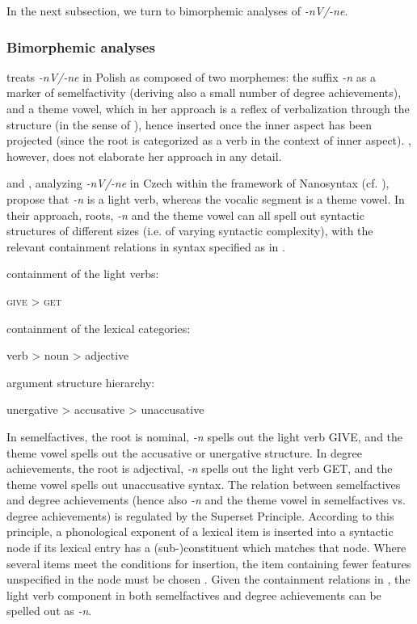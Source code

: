 \documentclass[output=paper,colorlinks,citecolor=brown]{langscibook}
\begin{document}
In the next subsection, we turn to bimorphemic analyses of \textit{-nV/-ne}. 

\subsubsection{Bimorphemic analyses} \label{str:sect:bimorphemic analyses}

\citet{sta+:Lazorczyk2010} treats \textit{-nV/-ne} in Polish as composed of two morphemes: the suffix \textit{-n} as a marker of semelfactivity (deriving also a small number of degree achievements), and a theme vowel, which in her approach is a reflex of verbalization through the structure (in the sense of \citealt{Borer2005Structuring}), hence inserted once the inner aspect has been projected (since the root is categorized as a verb in the context of inner aspect). \citet{sta+:Lazorczyk2010}, however, does not elaborate her approach in any detail.

\citet{TaraldsenMedovaWiland2019} and \citet{Wiland2019}, analyzing \textit{-nV/-ne} in Czech within the framework of Nanosyntax (cf. \citealt{Caha2009, Starke2009}), propose that \textit{-n} is a light verb, whereas the vocalic segment is a theme vowel. In their approach, roots, \textit{-n} and the theme vowel can all spell out syntactic structures of different sizes (i.e. of varying syntactic complexity), with the relevant containment relations in syntax specified as in .

\ea\label{str:ex:nV-Nano}
	\ea  containment of the light verbs: 			
 
\textsc{give} > \textsc{get}

\ex  containment of the lexical categories: 	   

verb > noun > adjective

\ex  argument structure hierarchy:				      

unergative > accusative > unaccusative
				
	\z
\z 

\noindent In semelfactives, the root is nominal, \textit{-n} spells out the light verb GIVE, and the theme vowel spells out the accusative or unergative structure. In degree achievements, the root is adjectival, \textit{-n} spells out the light verb GET, and the theme vowel spells out unaccusative syntax. The relation between semelfactives and degree achievements (hence also \textit{-n} and the theme vowel in semelfactives vs. degree achievements) is regulated by the Superset Principle. According to this principle, a phonological exponent of a lexical item is inserted into a syntactic node if its lexical entry has a (sub-)constituent which matches that node. Where several items meet the conditions for insertion, the item containing fewer features unspecified in the node must be chosen \citep{Starke2009}. Given the containment relations in , the light verb component in both semelfactives and degree achievements can be spelled out as \textit{-n}.
\end{document}
